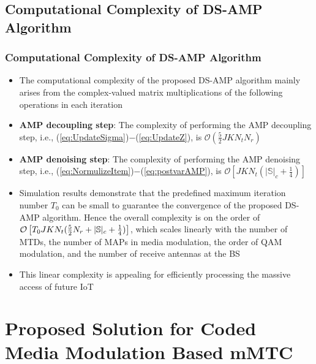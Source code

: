 \documentclass[9pt]{beamer}
\begin{document}
\subsection{Computational Complexity of DS-AMP Algorithm}
\begin{frame}
\frametitle{Computational Complexity of DS-AMP Algorithm}
\begin{itemize}
\item
The computational complexity of the proposed DS-AMP algorithm mainly arises from the complex-valued matrix multiplications of the following operations in each iteration
\item
{\bf AMP decoupling step}: The complexity of performing the AMP decoupling step, i.e., (\ref{eq:UpdateSigma})$-$(\ref{eq:UpdateZ}), is $\mathcal{O}(\frac{5}{2}JKN_tN_r)$
\item
{\bf AMP denoising step}: The complexity of performing the AMP denoising step, i.e., (\ref{eq:NormulizeItem})$-$(\ref{eq:postvarAMP}), is $\mathcal{O}\left[{JKN_t(|\mathbb{S}|_c+\frac{1}{4})}\right]$
\item
Simulation results demonstrate that the predefined maximum iteration number $T_0$ can be small to guarantee the convergence of the proposed DS-AMP algorithm. Hence the overall complexity is on the order of ${\cal O}\left[{T_0JKN_t(\frac{5}{2}N_r+|\mathbb{S}|_c+\frac{1}{4})}\right]$, which scales linearly with the number of MTDs, the number of MAPs in media modulation, the order of QAM modulation, and the number of receive antennas at the BS
\item
This linear complexity is appealing for efficiently processing the massive access of future IoT
\end{itemize}
\end{frame}

\section{Proposed Solution for Coded Media Modulation Based mMTC}
\end{document}
